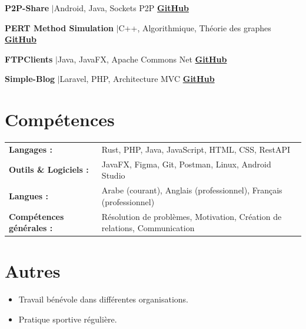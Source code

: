 \documentclass[a4paper,10pt]{article}
\begin{document}
\noindent\textbf{P2P-Share} \enspace$|$\enspace \textcolor{textgray}{Android, Java, Sockets P2P} \hfill \href{https://github.com/OussamaNahnah/P2P-Share}{\textbf{GitHub}}\par
{}\par
\vspace{2.5pt}

\noindent\textbf{PERT Method Simulation} \enspace$|$\enspace \textcolor{textgray}{C++, Algorithmique, Théorie des graphes} \hfill \href{https://github.com/OussamaNahnah/PERT}{\textbf{GitHub}}\par
{}\par
\vspace{2.5pt}


\noindent\textbf{FTPClients} \enspace$|$\enspace \textcolor{textgray}{Java, JavaFX, Apache Commons Net} \hfill \href{https://github.com/OussamaNahnah/FTPClients}{\textbf{GitHub}}\par
{}\par
\vspace{2.5pt}

\noindent\textbf{Simple-Blog} \enspace$|$\enspace \textcolor{textgray}{Laravel, PHP, Architecture MVC} \hfill \href{https://github.com/OussamaNahnah/Simple-Blog-}{\textbf{GitHub}}\par
{}\par

\section{Compétences}

\begin{tabular}{@{}l p{12.8cm}@{}}
    \textbf{Langages :} & Rust, PHP, Java, JavaScript, HTML, CSS, RestAPI \\[2pt]
    \textbf{Outils \& Logiciels :} & JavaFX, Figma, Git, Postman, Linux, Android Studio \\[2pt]
    \textbf{Langues :} & Arabe (courant), Anglais (professionnel), Français (professionnel) \\[2pt]
    \textbf{Compétences générales :} & Résolution de problèmes, Motivation, Création de relations, Communication
\end{tabular}

\section{Autres}
\begin{itemize}
    \item Travail bénévole dans différentes organisations.
    \item Pratique sportive régulière.
\end{itemize}
\end{document}
